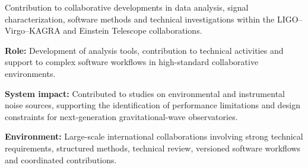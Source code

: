 \documentclass[8pt,a4paper,ragged2e,withhyper]{altacv}
\begin{document}
Contribution to collaborative developments in data analysis, signal characterization, software methods and technical investigations within the LIGO--Virgo--KAGRA and Einstein Telescope collaborations.

\textbf{Role:} Development of analysis tools, contribution to technical activities and support to complex software workflows in high-standard collaborative environments.

\textbf{System impact:} Contributed to studies on environmental and instrumental noise sources, supporting the identification of performance limitations and design constraints for next-generation gravitational-wave observatories.

\textbf{Environment:} Large-scale international collaborations involving strong technical requirements, structured methods, technical review, versioned software workflows and coordinated contributions.


\vspace{-.3cm}


{\small
{}
\newline
{}
}

\divider\smallskip
\vspace{-.3cm}


{\small
{}
\newline
{}
}

\divider\smallskip
\vspace{-.3cm}

\end{document}
